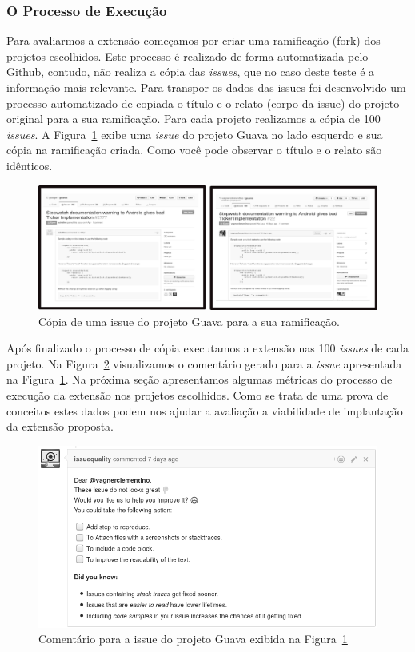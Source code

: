 \subsubsection{O Processo de Execução}
\label{sub:implementacao_processo_execucao}

Para avaliarmos a extensão começamos por criar uma ramificação (fork) dos
projetos escolhidos. Este processo é realizado de forma automatizada pelo
Github, contudo, não realiza a cópia das \textit{issues}, que no caso deste
teste é a informação mais relevante. Para transpor os dados das issues foi
desenvolvido um processo automatizado de copiada o título e o relato (corpo da
issue) do projeto original para a sua ramificação. Para cada projeto realizamos
a cópia de 100 \textit{issues}. A Figura~\ref{fig:copia-de-issues} exibe uma
\textit{issue} do projeto Guava no lado esquerdo e sua cópia na ramificação
criada. Como você pode observar o título e o relato são idênticos.

\begin{figure}[htpb]
    \centering
    \includegraphics[width=0.7\linewidth]{chapter-implementacao-extensoes-fgrm/img/copia-de-issues.png}
    \caption{Cópia de uma issue do projeto Guava para a sua ramificação.}
\label{fig:copia-de-issues}
\end{figure}

Após finalizado o processo de cópia executamos a extensão nas 100
\textit{issues} de cada projeto. Na Figura~\ref{fig:exemplo_comentario_issue}
visualizamos o comentário gerado para a \textit{issue} apresentada na
Figura~\ref{fig:copia-de-issues}. Na próxima seção apresentamos algumas métricas
do processo de execução da extensão nos projetos escolhidos. Como se trata de
uma prova de conceitos estes dados podem nos ajudar a avaliação a viabilidade de
implantação da extensão proposta.

\begin{figure}[htpb]
    \centering
    \includegraphics[width=0.7\linewidth]{chapter-implementacao-extensoes-fgrm/img/exemplo_comentario_issue.png}
    \caption{Comentário para a issue do projeto Guava exibida na Figura~\ref{fig:copia-de-issues}}
\label{fig:exemplo_comentario_issue}
\end{figure}

